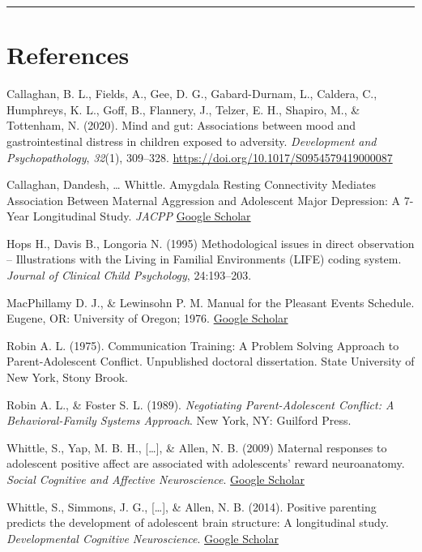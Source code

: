 \documentclass[]{book}
\begin{document}
\begin{center}\rule{0.5\linewidth}{0.5pt}\end{center}

\hypertarget{references}{%
\chapter{References}\label{references}}

Callaghan, B. L., Fields, A., Gee, D. G., Gabard-Durnam, L., Caldera, C., Humphreys, K. L., Goff, B., Flannery, J., Telzer, E. H., Shapiro, M., \& Tottenham, N. (2020). Mind and gut: Associations between mood and gastrointestinal distress in children exposed to adversity. \emph{Development and Psychopathology}, \emph{32}(1), 309--328. \url{https://doi.org/10.1017/S0954579419000087}

Callaghan, Dandesh, \ldots{} Whittle. Amygdala Resting Connectivity Mediates Association Between Maternal Aggression and Adolescent Major Depression: A 7-Year Longitudinal Study. \emph{JACPP} \href{https://www.jaacap.org/article/S0890-8567(17)31673-8/fulltext}{Google Scholar}

Hops H., Davis B., Longoria N. (1995) Methodological issues in direct observation -- Illustrations with the Living in Familial Environments (LIFE) coding system. \emph{Journal of Clinical Child Psychology}, 24:193--203.

MacPhillamy D. J., \& Lewinsohn P. M. Manual for the Pleasant Events Schedule. Eugene, OR: University of Oregon; 1976. \href{https://scholar.google.com/scholar_lookup?title=Manual+for+the+Pleasant+Events+Schedule\&author=DJ+MacPhillamy\&author=PM+Lewinsohn\&publication_year=1976\&}{Google Scholar}

Robin A. L. (1975). Communication Training: A Problem Solving Approach to Parent-Adolescent Conflict. Unpublished doctoral dissertation. State University of New York, Stony Brook.

Robin A. L., \& Foster S. L. (1989). \emph{Negotiating Parent-Adolescent Conflict: A Behavioral-Family Systems Approach}. New York, NY: Guilford Press.

Whittle, S., Yap, M. B. H., {[}\ldots{}{]}, \& Allen, N. B. (2009) Maternal responses to adolescent positive affect are associated with adolescents' reward neuroanatomy. \emph{Social Cognitive and Affective Neuroscience}. \href{https://www.ncbi.nlm.nih.gov/pmc/articles/PMC2728631/}{Google Scholar}

Whittle, S., Simmons, J. G., {[}\ldots{}{]}, \& Allen, N. B. (2014). Positive parenting predicts the development of adolescent brain structure: A longitudinal study. \emph{Developmental Cognitive Neuroscience}. \href{https://www.sciencedirect.com/science/article/pii/S1878929313000650}{Google Scholar}
\end{document}
